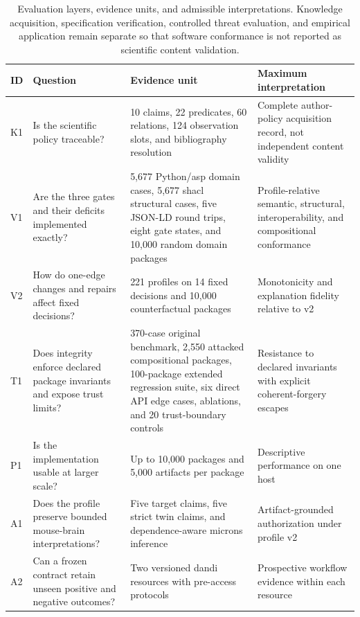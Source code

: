 \begin{table}[!htbp]
\centering
\caption{Evaluation layers, evidence units, and admissible interpretations. Knowledge acquisition, specification verification, controlled threat evaluation, and empirical application remain separate so that software conformance is not reported as scientific content validation.}
\label{tab:experiment-design-v2}
\scriptsize
\renewcommand{\arraystretch}{1.04}
\begin{tabularx}{\textwidth}{@{}P{0.06\textwidth}P{0.25\textwidth}P{0.29\textwidth}Y@{}}
\toprule
ID & Question & Evidence unit & Maximum interpretation \\
\midrule
K1 & Is the scientific policy traceable? & 10 claims, 22 predicates, 60 relations, 124 observation slots, and bibliography resolution & Complete author-policy acquisition record, not independent content validity \\
V1 & Are the three gates and their deficits implemented exactly? & 5,677 Python/\ac{asp} domain cases, 5,677 \ac{shacl} structural cases, five JSON-LD round trips, eight gate states, and 10,000 random domain packages & Profile-relative semantic, structural, interoperability, and compositional conformance \\
V2 & How do one-edge changes and repairs affect fixed decisions? & 221 profiles on 14 fixed decisions and 10,000 counterfactual packages & Monotonicity and explanation fidelity relative to v2 \\
T1 & Does integrity enforce declared package invariants and expose trust limits? & 370-case original benchmark, 2,550 attacked compositional packages, 100-package extended regression suite, six direct API edge cases, ablations, and 20 trust-boundary controls & Resistance to declared invariants with explicit coherent-forgery escapes \\
P1 & Is the implementation usable at larger scale? & Up to 10,000 packages and 5,000 artifacts per package & Descriptive performance on one host \\
A1 & Does the profile preserve bounded mouse-brain interpretations? & Five target claims, five strict twin claims, and dependence-aware \ac{microns} inference & Artifact-grounded authorization under profile v2 \\
A2 & Can a frozen contract retain unseen positive and negative outcomes? & Two versioned \ac{dandi} resources with pre-access protocols & Prospective workflow evidence within each resource \\
\bottomrule
\end{tabularx}
\end{table}
